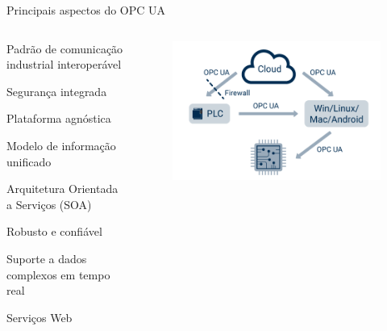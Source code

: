 \documentclass{uspBeamer}
\begin{document}
    \begin{frame}{Principais aspectos do OPC UA}
        \begin{columns}
            \begin{column}{.5\textwidth}
                \begin{wideitemize}
                    \item Padrão de comunicação industrial interoperável
                    \item Segurança integrada
                    \item Plataforma agnóstica
                    \item Modelo de informação unificado
                    \item Arquitetura Orientada a Serviços (SOA)
                    \item Robusto e confiável
                    \item Suporte a dados complexos em tempo real
                    \item Serviços Web
                \end{wideitemize}
            \end{column}
            \begin{column}{.5\textwidth}
                \begin{figure}
                    \includegraphics[scale=0.30]{opcua1.png}
                \end{figure}
            \end{column}
        \end{columns}
    \end{frame}
\end{document}
